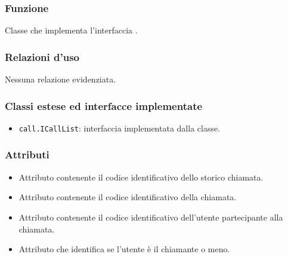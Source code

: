 
\subsubsection*{Funzione}
Classe che implementa l'interfaccia .

\subsubsection*{Relazioni d'uso}

Nessuna relazione evidenziata.

\subsubsection*{Classi estese ed interfacce implementate}
\begin{itemize}
	\item \texttt{call.ICallList}: interfaccia implementata dalla classe.
\end{itemize}

\subsubsection*{Attributi}

\begin{itemize}
	\item{}
	Attributo contenente il codice identificativo dello storico chiamata.
	\item{}
	Attributo contenente il codice identificativo della chiamata.
	\item{}
	Attributo contenente il codice identificativo dell'utente partecipante alla chiamata.
	\item{}
	Attributo che identifica se l'utente è il chiamante o meno.
\end{itemize}

